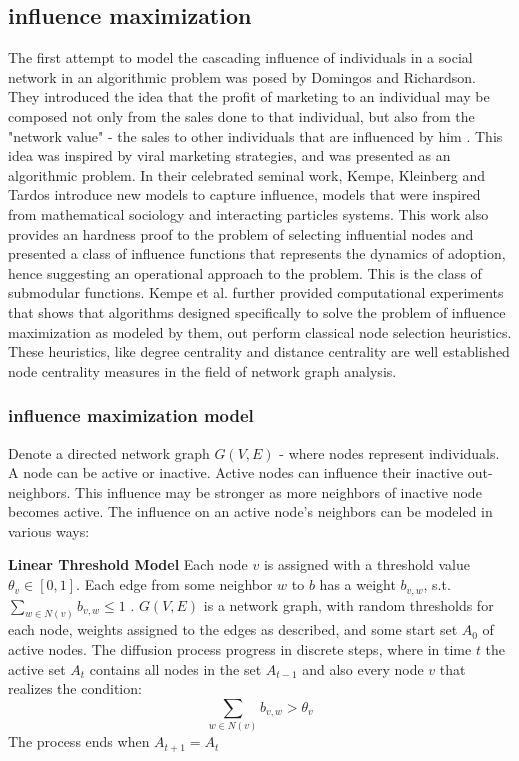 \subsection{influence maximization}\label{sec:inf}

The first attempt to model the cascading influence of individuals in a social network in an algorithmic problem was posed by Domingos and Richardson. They introduced the idea that the profit of marketing to an individual may be composed not only from the sales done to that individual, but also from the "network value" - the sales to other individuals that are influenced by him \cite{domingos2001mining}. This idea was inspired by viral marketing strategies, and was presented as an algorithmic problem.
In their celebrated seminal work, Kempe, Kleinberg and Tardos \cite{kempe2003maximizing} introduce new models to capture influence, models that were inspired from mathematical sociology and interacting particles systems. This work also provides an hardness proof to the problem of selecting influential nodes and presented a class of influence functions that represents the dynamics of adoption, hence suggesting an operational approach to the problem. This is the class of submodular functions. 
Kempe et al. further provided computational experiments that shows that algorithms designed specifically to solve the problem of influence maximization as modeled by them, out perform classical node selection heuristics. These heuristics, like degree centrality and distance centrality are well established node centrality measures in the field of network graph analysis.

\subsubsection{influence maximization model}
Denote a directed network graph $G(V,E)$ - where nodes represent individuals. A node can be active or inactive. Active nodes can influence their inactive out-neighbors. This influence may be stronger as more neighbors of inactive node becomes active. The influence on an active node's neighbors can be modeled in various ways:

\textbf{Linear Threshold Model}
Each node $v$ is assigned with a threshold value $\theta_v\in[0,1]$. Each edge from some neighbor $w$ to $b$ has a weight $b_{v,w}$, s.t. 
$\sum\limits_{w\in N(v)}{b_{v,w}}\le 1$ . $G(V,E)$ is a network graph, with random thresholds for each node, weights assigned to the edges as described, and some start set $A_0$ of active nodes. The diffusion process progress in discrete steps, where in time $t$ the active set $A_t$ contains all nodes in the set $A_{t-1}$ and also every node $v$ that realizes the condition: $$\sum\limits_{w\in N(v)}{b_{v,w}}>\theta_v$$ The process ends when $A_{t+1}=A_t$


